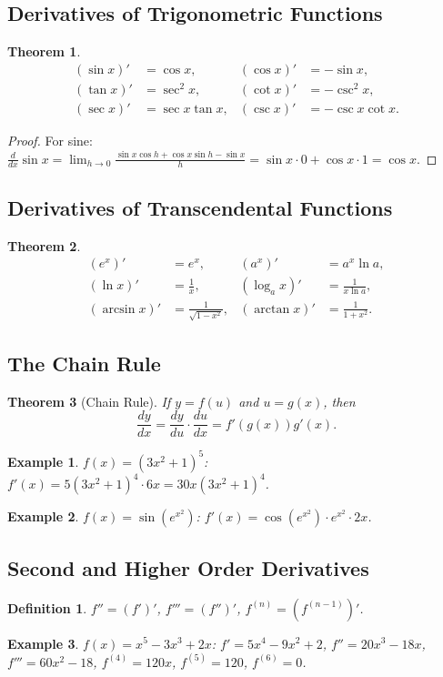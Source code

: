 \documentclass[11pt,a4paper]{article}
\newtheorem{example}{Example}
\newtheorem{theorem}{Theorem}
\newtheorem{definition}{Definition}
\begin{document}
\subsection{Derivatives of Trigonometric Functions}
\begin{theorem}
\begin{align*}
(\sin x)' &= \cos x, & (\cos x)' &= -\sin x, \\
(\tan x)' &= \sec^2 x, & (\cot x)' &= -\csc^2 x, \\
(\sec x)' &= \sec x \tan x, & (\csc x)' &= -\csc x \cot x.
\end{align*}
\end{theorem}
\begin{proof}
For sine: $\frac{d}{dx}\sin x = \lim_{h \to 0} \frac{\sin x \cos h + \cos x \sin h - \sin x}{h} = \sin x \cdot 0 + \cos x \cdot 1 = \cos x$.
\end{proof}
\subsection{Derivatives of Transcendental Functions}
\begin{theorem}
\begin{align*}
(e^x)' &= e^x, & (a^x)' &= a^x \ln a, \\
(\ln x)' &= \frac{1}{x}, & (\log_a x)' &= \frac{1}{x \ln a}, \\
(\arcsin x)' &= \frac{1}{\sqrt{1-x^2}}, & (\arctan x)' &= \frac{1}{1+x^2}.
\end{align*}
\end{theorem}
\subsection{The Chain Rule}
\begin{theorem}[Chain Rule]
If $y = f(u)$ and $u = g(x)$, then
\[
\frac{dy}{dx} = \frac{dy}{du} \cdot \frac{du}{dx} = f'(g(x)) g'(x).
\]
\end{theorem}
\begin{example}
$f(x) = (3x^2+1)^5$: $f'(x) = 5(3x^2+1)^4 \cdot 6x = 30x(3x^2+1)^4$.
\end{example}
\begin{example}
$f(x) = \sin(e^{x^2})$: $f'(x) = \cos(e^{x^2}) \cdot e^{x^2} \cdot 2x$.
\end{example}
\subsection{Second and Higher Order Derivatives}
\begin{definition}
$f'' = (f')'$, $f''' = (f'')'$, $f^{(n)} = (f^{(n-1)})'$.
\end{definition}
\begin{example}
$f(x) = x^5 - 3x^3 + 2x$: $f' = 5x^4 - 9x^2 + 2$, $f'' = 20x^3 - 18x$, $f''' = 60x^2 - 18$, $f^{(4)} = 120x$, $f^{(5)} = 120$, $f^{(6)} = 0$.
\end{example}
\end{document}
